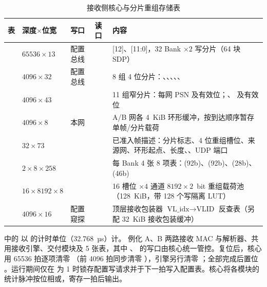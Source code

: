 \begin{table}\centering\small
\caption{接收侧核心与分片重组存储表}\label{tab:rxtables}
\begin{tabularx}{\linewidth}{>{\raggedright\arraybackslash}p{2.5cm}>{\raggedleft\arraybackslash}p{2.0cm}>{\raggedright\arraybackslash}p{1.9cm}>{\raggedright\arraybackslash}p{1.9cm}L}
\toprule
表 & 深度$\times$位宽 & 写口 & 读口 & 内容 \\
\midrule
{} & $65536\times 13$ & 配置总线 &  & [12]、[11:0]，32 Bank $\times 2$ 写分片（64 块 SDP） \\
 & $4096\times 32$ & 配置总线 &  & 8 组 4 位分片：、、、、、 \\
 & $4096\times 43$ &  &  & 11 组窄分片：每网 PSN 及有效位；、 及有效位 \\
 & $4096\times 8$ & 本网  &  & A/B 网各 4~KiB 环形缓冲，按到达顺序暂存单帧/分片载荷 \\
 & $32\times 73$ &  &  & 已准入帧描述：分片标志、4 位重组槽位、来源网、环形起点、长度、、UDP 端口 \\
 & $2\times 8\times 258$ &  &  & 每 Bank 4 张 8 项表：(92b)、(92b)、(28b)、(46b) \\
 & $16\times 8192\times 8$ &  &  & 16 槽位 $\times 4$ 通道 $8192\times 2$~bit 重组载荷池（128~KiB，带 128 个写隔离 LUT） \\
 & $4096\times 16$ & 配置窥探 &  & 顶层接收包装器 $\text{VL\_idx}\rightarrow\text{VLID}$ 反查表（另配 32~KiB 接收包装缓冲） \\
\bottomrule
\end{tabularx}
\end{table}

 中的  以  的计时单位（32.768~µs）计。 例化 A、B 两路接收 MAC 与解析器、共用接收引擎、交付模块及 5 张表，其中 、 的写口由核心统一管控。复位后，核心用 65536 拍逐项清零 （前 4096 拍同步清零 ），引擎另行清零 ；全部完成后置位 。运行期间仅在  为 1 时锁存配置写请求并于下一拍写入配置表。核心将各模块的统计脉冲按位相或，寄存一拍后输出。

